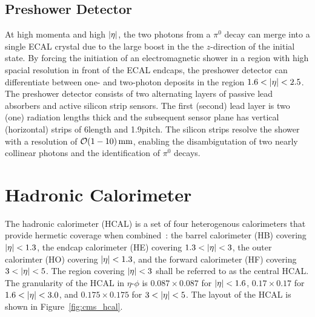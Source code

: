 \subsection{Preshower Detector}

At high momenta and high $\lvert \eta \rvert$, the two photons from a $\pi^0$ decay can merge into a single ECAL crystal due to the large boost in the the $z$-direction of the initial state.
By forcing the initiation of an electromagnetic shower in a region with high spacial resolution in front of the ECAL endcaps, the preshower detector can differentiate between one- and two-photon deposits in the region $1.6 < \lvert \eta \rvert < 2.5$.
The preshower detector consists of two alternating layers of passive lead absorbers and active silicon strip sensors.
The first (second) lead layer is two (one) radiation lengths thick and the subsequent sensor plane has vertical (horizontal) strips of 6\cm length and 1.9\mm pitch.
The silicon strips resolve the shower with a resolution of $\mathcal{O}(1-10)\,\text{mm}$, enabling the disambigutation of two nearly collinear photons and the identification of $\pi^0$ decays.

\section{Hadronic Calorimeter}

The hadronic calorimeter (HCAL) is a set of four heterogenous calorimeters that provide hermetic coverage when combined~\cite{CMS2008}: the barrel calorimeter (HB) covering $\lvert \eta \rvert< 1.3$, the endcap calorimeter (HE) covering $1.3 < \lvert \eta \rvert < 3$, the outer calorimter (HO) covering $\lvert \eta \rvert < 1.3$, and the forward calorimeter (HF) covering $3 < \lvert \eta \rvert < 5$.
The region covering $\lvert \eta \rvert < 3$ shall be referred to as the central HCAL.
The granularity of the HCAL in $\eta$-$\phi$ is $0.087\times0.087$ for $\lvert \eta \rvert<1.6$, $0.17\times0.17$ for $1.6 < \lvert \eta \rvert < 3.0$, and $0.175\times0.175$ for $3 < \lvert \eta \rvert < 5$.
The layout of the HCAL is shown in Figure~\ref{fig:cms_hcal}. 

